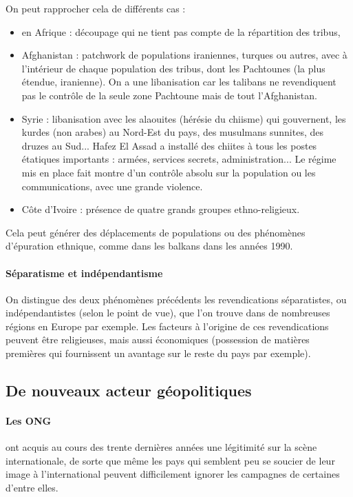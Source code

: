 \documentclass[a4paper,10pt]{article}
\begin{document}
		On peut rapprocher cela de différents cas :
		\begin{itemize}
		\item en Afrique : découpage qui ne tient pas compte de la répartition des tribus,
		\item Afghanistan : patchwork de populations iraniennes, turques ou autres, avec à l'intérieur de chaque population des tribus, dont les Pachtounes (la plus étendue, iranienne).
			On a une libanisation car les talibans ne revendiquent pas le contrôle de la seule zone Pachtoune mais de tout l'Afghanistan.
		\item Syrie : libanisation avec les alaouites (hérésie du chiisme) qui gouvernent, les kurdes (non arabes) au Nord-Est du pays, des musulmans sunnites, des druzes au Sud...
			Hafez El Assad a installé des chiites à tous les postes étatiques importants : armées, services secrets, administration...
			Le régime mis en place fait montre d'un contrôle absolu sur la population ou les communications, avec une grande violence.
		\item Côte d'Ivoire : présence de quatre grands groupes ethno-religieux.
		\end{itemize}

		Cela peut générer des déplacements de populations ou des phénomènes d'épuration ethnique, comme dans les balkans dans les années 1990.

		\paragraph{Séparatisme et indépendantisme}

		On distingue des deux phénomènes précédents les revendications séparatistes, ou indépendantistes (selon le point de vue), que l'on trouve dans de nombreuses régions en Europe par exemple.
		Les facteurs à l'origine de ces revendications peuvent être religieuses, mais aussi économiques (possession de matières premières qui fournissent un avantage sur le reste du pays par exemple).

	\subsection{De nouveaux acteur géopolitiques}

		\paragraph{Les ONG}
			ont acquis au cours des trente dernières années une légitimité sur la scène internationale, de sorte que même les pays qui semblent peu se soucier de leur image à l'international peuvent difficilement ignorer les campagnes de certaines d'entre elles.
\end{document}

